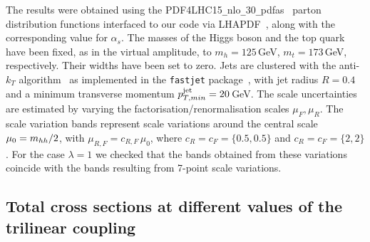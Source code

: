 
The results were obtained using the
PDF4LHC15{\tt\_}nlo{\tt\_}30{\tt\_}pdfas~\cite{Butterworth:2015oua,CT14,MMHT14,NNPDF}
parton distribution functions interfaced to our code via
LHAPDF~\cite{Buckley:2014ana}, along with the corresponding value for
$\alpha_s$.  The masses of the Higgs boson and the top quark have been
fixed, as in the virtual amplitude, to $m_h=125$\,GeV, $m_t=173$\,GeV,
respectively. Their widths have been set to zero.   
Jets are clustered with the
anti-$k_T$ algorithm~\cite{Cacciari:2008gp} as implemented in the
{\tt fastjet} package~\cite{Cacciari:2005hq, Cacciari:2011ma}, with jet
radius $R=0.4$ and a minimum transverse momentum 
$p_{T,min}^{\rm{jet}}=20$\,GeV.  The scale uncertainties are
estimated by varying the factorisation/renormalisation scales
$\mu_{F}, \mu_{R}$. The scale variation bands 
represent scale variations around the central scale $\mu_0 =m_{hh}/2$, with
$\mu_{R,F}=c_{R,F}\,\mu_0$, where $c_R=c_F= \{0.5,0.5\}$ and $c_R=c_F= \{2,2\}$.
For the case $\lambda=1$ we checked that the bands obtained from these variations coincide with the bands resulting from 7-point scale variations.

\subsection{Total cross sections at different values of the trilinear coupling}

